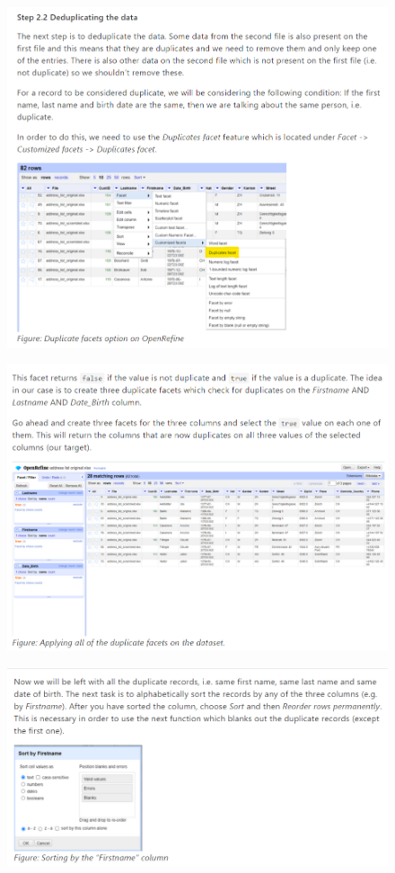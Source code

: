 \begin{figure}[H]
    \includegraphics[width=\linewidth]{./Figures/Appendices/worksheet/32.png}
\end{figure}
\begin{figure}[H]
    \includegraphics[width=\linewidth]{./Figures/Appendices/worksheet/33.png}
\end{figure}
\begin{figure}[H]
    \includegraphics[width=\linewidth]{./Figures/Appendices/worksheet/34.png}
\end{figure}
